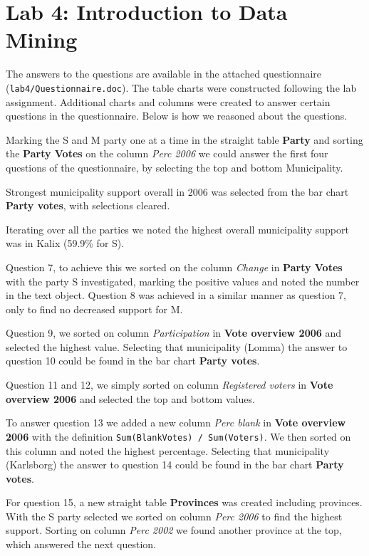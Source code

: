 \documentclass[a4paper]{article}
\begin{document}
\newpage

\section{Lab 4: Introduction to Data Mining}

The answers to the questions are available in the attached questionnaire
\\(\verb=lab4/Questionnaire.doc=). The table charts were constructed following
the lab assignment. Additional charts and columns were created to answer certain
questions in the questionnaire.  Below is how we reasoned about the questions.

Marking the S and M party one at a time in the straight table \textbf{Party} and
sorting the \textbf{Party Votes} on the column \textit{Perc 2006} we could
answer the first four questions of the questionnaire, by selecting the top and
bottom Municipality.

Strongest municipality support overall in 2006 was selected from the bar chart
\textbf{Party votes}, with selections cleared.

Iterating over all the parties we noted the highest overall municipality support
was in Kalix (59.9\% for S).

Question 7, to achieve this we sorted on the column \textit{Change} in
\textbf{Party Votes} with the party S investigated, marking the positive values
and noted the number in the text object. Question 8 was achieved in a similar
manner as question 7, only to find no decreased support for M.

Question 9, we sorted on column \textit{Participation} in \textbf{Vote overview
2006} and selected the highest value. Selecting that municipality (Lomma) the
answer to question 10 could be found in the bar chart \textbf{Party votes}.

Question 11 and 12, we simply sorted on column \textit{Registered voters} in
\textbf{Vote overview 2006} and selected the top and bottom values.

To answer question 13 we added a new column \textit{Perc blank} in \textbf{Vote
overview 2006} with the definition \verb=Sum(BlankVotes) / Sum(Voters)=. We
then sorted on this column and noted the highest percentage. Selecting that
municipality (Karlsborg) the answer to question 14 could be found in the bar
chart \textbf{Party votes}.

For question 15, a new straight table \textbf{Provinces} was created including
provinces. With the S party selected we sorted on column \textit{Perc 2006} to
find the highest support. Sorting on column \textit{Perc 2002} we found another
province at the top, which answered the next question.
\end{document}
